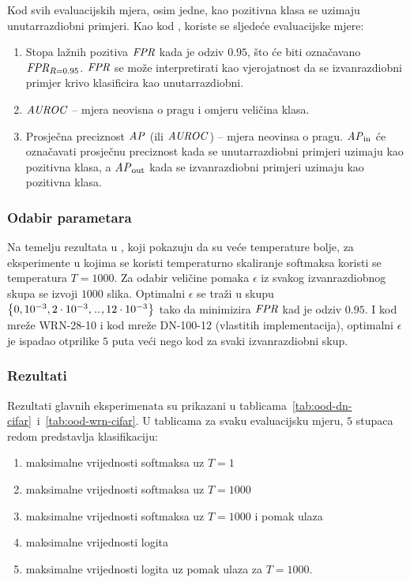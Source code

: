 \documentclass[utf8, diplomski, lmodern]{fer}
\begin{document}
Kod svih evaluacijskih mjera, osim jedne, kao pozitivna klasa se uzimaju unutarrazdiobni primjeri. Kao kod \cite{Liang:2017:PDOODENN}, koriste se sljedeće evaluacijske mjere:
\begin{enumerate}
	\item Stopa lažnih pozitiva $\mathit{FPR}$ kada je odziv $0.95$, što će biti označavano $\mathit{FPR}_{R=0.95}$. $\mathit{FPR}$ se može interpretirati kao vjerojatnost da se izvanrazdiobni primjer krivo klasificira kao unutarrazdiobni.
	\item $\mathit{AUROC}$ -- mjera neovisna o pragu i omjeru veličina klasa.
	\item Prosječna preciznost $\mathit{AP}$ (ili $\mathit{AUROC}$) -- mjera neovinsa o pragu. $\mathit{AP}_\text{in}$ će označavati prosječnu preciznost kada se unutarrazdiobni primjeri uzimaju kao pozitivna klasa, a $\mathit{AP}_\text{out}$ kada se izvanrazdiobni primjeri uzimaju kao pozitivna klasa.
\end{enumerate}

\subsubsection{Odabir parametara}

Na temelju rezultata u \cite{Liang:2017:PDOODENN}, koji pokazuju da su veće temperature bolje, za eksperimente u kojima se koristi temperaturno skaliranje softmaksa koristi se temperatura $T=1000$. Za odabir veličine pomaka $\epsilon$ iz svakog izvanrazdiobnog skupa se izvoji $1000$ slika. Optimalni $\epsilon$ se traži u skupu $\cbr{0,10^{-3},2\cdot 10^{-3},\bidot,12\cdot 10^{-3}}$ tako da minimizira $\mathit{FPR}$ kad je odziv $0.95$. I kod mreže WRN-28-10 i kod mreže DN-100-12 (vlastitih implementacija), optimalni $\epsilon$ je ispadao otprilike $5$ puta veći nego kod \citet{Liang:2017:PDOODENN} za svaki izvanrazdiobni skup.

\subsubsection{Rezultati}

Rezultati glavnih eksperimenata su prikazani u tablicama~\ref{tab:ood-dn-cifar}~i~\ref{tab:ood-wrn-cifar}. U tablicama za svaku evaluacijsku mjeru, $5$ stupaca redom predstavlja klasifikaciju:
\begin{enumerate}[topsep=0pt,itemsep=0pt,partopsep=0pt]
\item maksimalne vrijednosti softmaksa uz $T=1$
\item maksimalne vrijednosti softmaksa uz $T=1000$ %
\item maksimalne vrijednosti softmaksa uz $T=1000$ i pomak ulaza
\item maksimalne vrijednosti logita
\item maksimalne vrijednosti logita uz pomak ulaza za $T=1000$.
\end{enumerate}
\end{document}
